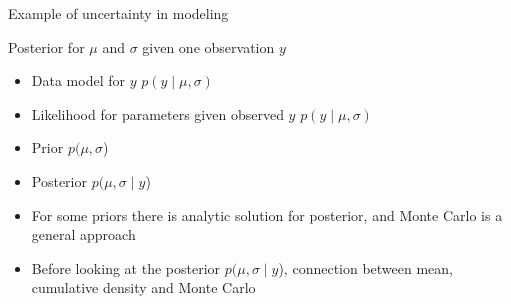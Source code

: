 \documentclass[finnish,english,t]{beamer}
\DeclareMathOperator{\normal}{normal}
\begin{document}
\begin{frame}{Example of uncertainty in modeling}

  

\end{frame}



\begin{frame}{Posterior for $\mu$ and $\sigma$ given one observation $y$}

  \begin{itemize}
  \item<+-> Data model for $y$ $p(y \mid \mu, \sigma)$
  \item<+-> Likelihood for parameters given observed $y$ $p(y \mid \mu, \sigma)$
  \item<+-> Prior $p(\mu, \sigma$)
  \item<+-> Posterior $p(\mu, \sigma \mid y $)
  \item<+-> For some priors there is analytic solution for posterior,
    and Monte Carlo is a general approach
  \item<+-> Before looking at the posterior $p(\mu, \sigma \mid y $),
    connection between mean, cumulative density and Monte Carlo
  \end{itemize}
  
\end{frame}
\end{document}

